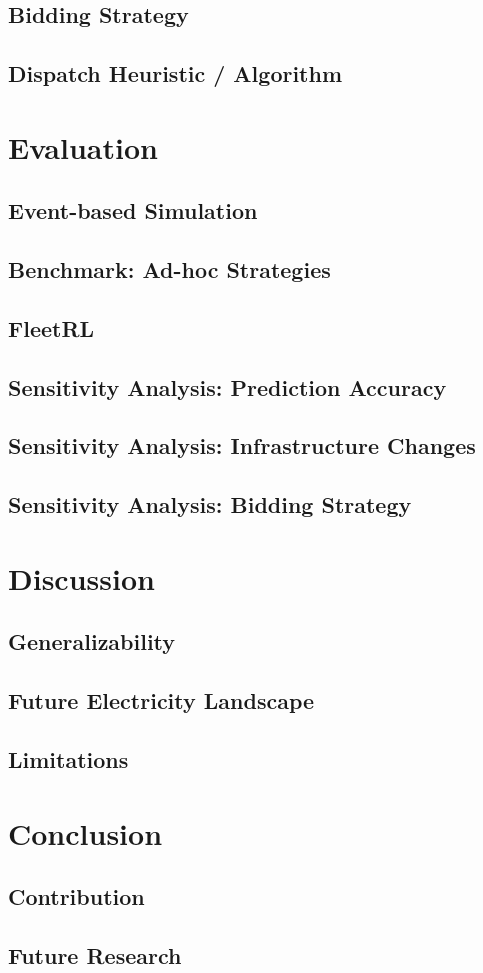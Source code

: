\documentclass[a4paper, twoside, 12pt]{article}
\begin{document}
\subsection{Bidding Strategy}
\label{sec:org7fe0f82}
\subsection{Dispatch Heuristic / Algorithm}
\label{sec:org5d73b6e}

\section{Evaluation}
\label{sec:org8b4fc4e}
\subsection{Event-based Simulation}
\label{sec:org0b74391}
\subsection{Benchmark: Ad-hoc Strategies}
\label{sec:org61a919f}
\subsection{FleetRL}
\label{sec:org4f33474}
\subsection{Sensitivity Analysis: Prediction Accuracy}
\label{sec:org24b66e9}
\subsection{Sensitivity Analysis: Infrastructure Changes}
\label{sec:org5e1b7d6}
\subsection{Sensitivity Analysis: Bidding Strategy}
\label{sec:orgef4cfe9}
\section{Discussion}
\label{sec:org7c5c733}
\subsection{Generalizability}
\label{sec:org21de67c}
\subsection{Future Electricity Landscape}
\label{sec:orgb259db1}
\subsection{Limitations}
\label{sec:orgcc78e50}
\section{Conclusion}
\label{sec:orgd4064c8}
\subsection{Contribution}
\label{sec:orgeea09af}
\subsection{Future Research}
\label{sec:org5348f97}


\clearpage


\end{document}
